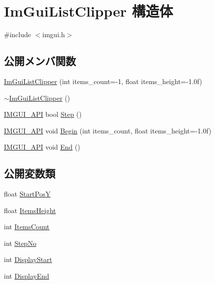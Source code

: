 \hypertarget{struct_im_gui_list_clipper}{}\section{Im\+Gui\+List\+Clipper 構造体}
\label{struct_im_gui_list_clipper}


{\ttfamily \#include $<$imgui.\+h$>$}

\subsection*{公開メンバ関数}
\begin{DoxyCompactItemize}
\item 
\mbox{\hyperlink{struct_im_gui_list_clipper_a0dc870fa31a56d3ace7625450f42937a}{Im\+Gui\+List\+Clipper}} (int items\+\_\+count=-\/1, float items\+\_\+height=-\/1.\+0f)
\item 
\mbox{\hyperlink{struct_im_gui_list_clipper_ada915f0ae4446df73c1a2372bde65293}{$\sim$\+Im\+Gui\+List\+Clipper}} ()
\item 
\mbox{\hyperlink{imgui_8h_a43829975e84e45d1149597467a14bbf5}{I\+M\+G\+U\+I\+\_\+\+A\+PI}} bool \mbox{\hyperlink{struct_im_gui_list_clipper_ac3e115812c3c4e5a39578a7aa955379a}{Step}} ()
\item 
\mbox{\hyperlink{imgui_8h_a43829975e84e45d1149597467a14bbf5}{I\+M\+G\+U\+I\+\_\+\+A\+PI}} void \mbox{\hyperlink{struct_im_gui_list_clipper_a746fbd724a41dbe88fef4875a2b1e9c7}{Begin}} (int items\+\_\+count, float items\+\_\+height=-\/1.\+0f)
\item 
\mbox{\hyperlink{imgui_8h_a43829975e84e45d1149597467a14bbf5}{I\+M\+G\+U\+I\+\_\+\+A\+PI}} void \mbox{\hyperlink{struct_im_gui_list_clipper_a3e6aec0db317985319a78513fc2c8068}{End}} ()
\end{DoxyCompactItemize}
\subsection*{公開変数類}
\begin{DoxyCompactItemize}
\item 
float \mbox{\hyperlink{struct_im_gui_list_clipper_affee91b338520cd4bd59b5b680dcb5ae}{Start\+PosY}}
\item 
float \mbox{\hyperlink{struct_im_gui_list_clipper_a19762cb78ff0adccb414027c25678a60}{Items\+Height}}
\item 
int \mbox{\hyperlink{struct_im_gui_list_clipper_a4e2b4e8efe10615d04ad2aeea467f522}{Items\+Count}}
\item 
int \mbox{\hyperlink{struct_im_gui_list_clipper_a8fe78f0368e16425c33fd35ca45d1912}{Step\+No}}
\item 
int \mbox{\hyperlink{struct_im_gui_list_clipper_a9d096e06e5633fd77a8a209c00fe454a}{Display\+Start}}
\item 
int \mbox{\hyperlink{struct_im_gui_list_clipper_aa49e30d04ad8f8b95fbaa62dfbb4ea3e}{Display\+End}}
\end{DoxyCompactItemize}



